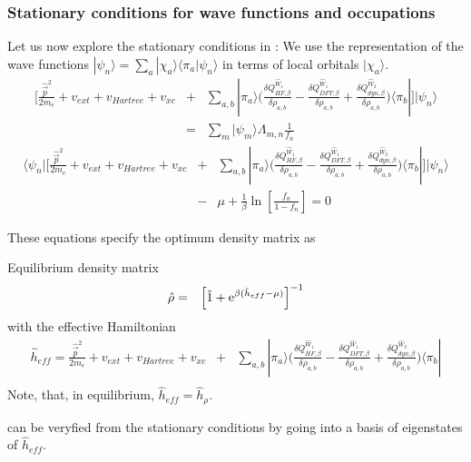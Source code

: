 \documentclass[11pt,a4paper]{report}
\begin{document}
\subsubsection{Stationary conditions for wave functions and occupations}
Let us now explore the stationary conditions in : We use the
representation of the wave functions $|\psi_n\rangle=\sum_a
|\chi_a\rangle\langle\pi_a|\psi_n\rangle$ in terms of local orbitals
$|\chi_a\rangle$.
\begin{eqnarray}
\biggl[\frac{\hat{\vec{p}}^2}{2m_e}+v_{ext}+v_{Hartree}+v_{xc}
&
+&\sum_{a,b}|\pi_a\rangle\biggl(
\frac{\delta Q^{\hat{W}_1}_{HF,\beta}}{\delta\rho_{a,b}}
-\frac{\delta Q^{\hat{W}_1}_{DFT,\beta}}{\delta\rho_{a,b}}
+\frac{\delta Q^{\hat{W}_2}_{dyn,\beta}}{\delta\rho_{a,b}}
\biggr)\langle\pi_b|
\biggr]|\psi_n\rangle
\nonumber\\
&=&\sum_{m}|\psi_m\rangle\Lambda_{m,n}\frac{1}{f_n}
\end{eqnarray}
\begin{eqnarray}
\langle\psi_n|
\biggl[
\frac{\hat{\vec{p}}^2}{2m_e}+v_{ext}+v_{Hartree}+v_{xc}
&+&\sum_{a,b}|\pi_a\rangle\biggl(
\frac{\delta Q^{\hat{W}_1}_{HF,\beta}}{\delta\rho_{a,b}}
-\frac{\delta Q^{\hat{W}_1}_{DFT,\beta}}{\delta\rho_{a,b}}
+\frac{\delta Q^{\hat{W}_2}_{dyn,\beta}}{\delta\rho_{a,b}}
\biggr)\langle\pi_b|
\biggr]|\psi_n\rangle
\nonumber\\
&-&\mu+\frac{1}{\beta}\ln\left[\frac{f_n}{1-f_n}\right]=0
\end{eqnarray}

These equations specify the optimum density matrix as
\begin{myshadowminipage}{Equilibrium density matrix}
\begin{eqnarray}
\hat{\rho}&=&\left[\hat{1}+\mathrm{e}^{\beta(\hat{h}_{eff}-\mu)}\right]^{-1}
\label{eq:rhoopt}
\end{eqnarray}
with the effective Hamiltonian
\begin{eqnarray}
\hat{h}_{eff}=\frac{\hat{\vec{p}}^2}{2m_e}+v_{ext}+v_{Hartree}+v_{xc}
&+&\sum_{a,b}|\pi_a\rangle\biggl(
\frac{\delta Q^{\hat{W}_1}_{HF,\beta}}{\delta\rho_{a,b}}
-\frac{\delta Q^{\hat{W}_1}_{DFT,\beta}}{\delta\rho_{a,b}}
+\frac{\delta Q^{\hat{W}_2}_{dyn,\beta}}{\delta\rho_{a,b}}
\biggr)\langle\pi_b|
\nonumber\\
\end{eqnarray}
Note, that, in equilibrium, $\hat{h}_{eff}=\hat{h}_\rho$.
\end{myshadowminipage}
 can be veryfied from the stationary conditions by going
into a basis of eigenstates of $\hat{h}_{eff}$.
\end{document}
